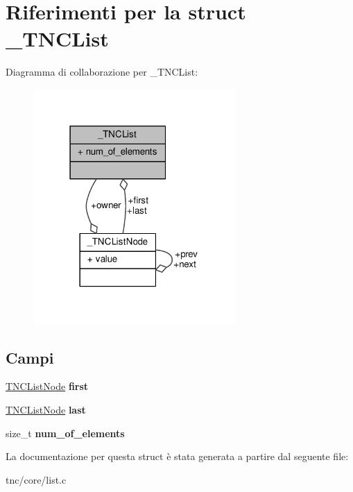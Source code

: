 \hypertarget{struct__TNCList}{}\section{Riferimenti per la struct \+\_\+\+T\+N\+C\+List}
\label{struct__TNCList}


Diagramma di collaborazione per \+\_\+\+T\+N\+C\+List\+:
\nopagebreak
\begin{figure}[H]
\begin{center}
\leavevmode
\includegraphics[width=219pt]{struct__TNCList__coll__graph}
\end{center}
\end{figure}
\subsection*{Campi}
\begin{DoxyCompactItemize}
\item 
\hypertarget{struct__TNCList_a1d3cd6061076ddaf851b229110518ead}{}\hyperlink{list_8h_a191e145c71bdead687daa62aaf197419}{T\+N\+C\+List\+Node} {\bfseries first}\label{struct__TNCList_a1d3cd6061076ddaf851b229110518ead}

\item 
\hypertarget{struct__TNCList_a4c6d7c9336b12de884fae1374eccf543}{}\hyperlink{list_8h_a191e145c71bdead687daa62aaf197419}{T\+N\+C\+List\+Node} {\bfseries last}\label{struct__TNCList_a4c6d7c9336b12de884fae1374eccf543}

\item 
\hypertarget{struct__TNCList_a0de43585e94a29d341464ff785344328}{}size\+\_\+t {\bfseries num\+\_\+of\+\_\+elements}\label{struct__TNCList_a0de43585e94a29d341464ff785344328}

\end{DoxyCompactItemize}


La documentazione per questa struct è stata generata a partire dal seguente file\+:\begin{DoxyCompactItemize}
\item 
tnc/core/list.\+c\end{DoxyCompactItemize}

